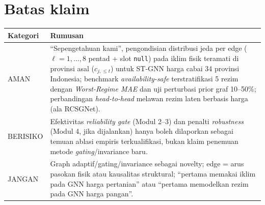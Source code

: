 \documentclass[11pt,a4paper]{article}
\begin{document}
\section{Batas klaim}
\begin{table}[H]
\centering
\small
\begin{tabular}{@{}L{2.4cm}L{11.8cm}@{}}
\toprule
Kategori & Rumusan \\
\midrule
AMAN & ``Sepengetahuan kami'', pengondisian distribusi jeda per edge ($\ell=1,\dots,8$ pentad + slot \texttt{null}) pada iklim fisik teramati di provinsi asal ($c_{j,\le t}$) untuk ST-GNN harga cabai 34 provinsi Indonesia; benchmark \textit{availability-safe} terstratifikasi 5 rezim dengan \textit{Worst-Regime MAE} dan uji perturbasi prior graf 10--50\%; perbandingan \textit{head-to-head} melawan rezim laten berbasis harga (ala RCSGNet). \\
BERISIKO & Efektivitas \textit{reliability gate} (Modul 2--3) dan penalti \textit{robustness} (Modul 4, jika dijalankan) hanya boleh dilaporkan sebagai temuan ablasi empiris terkualifikasi, bukan klaim penemuan metode \textit{gating}/invariance baru. \\
JANGAN & Graph adaptif/gating/invariance sebagai novelty; edge = arus pasokan fisik atau kausalitas struktural; ``pertama memakai iklim pada GNN harga pertanian'' atau ``pertama memodelkan rezim pada GNN harga pangan''. \\
\bottomrule
\end{tabular}
\end{table}
\end{document}
